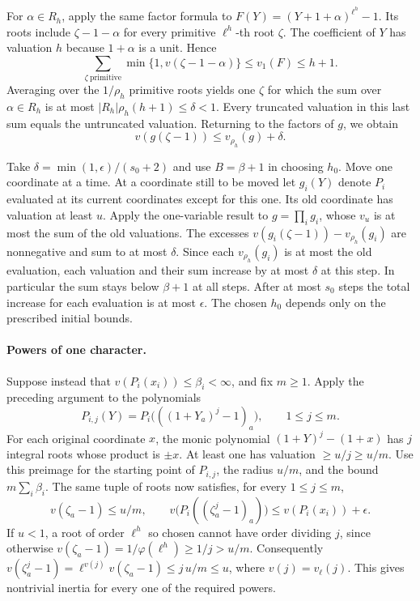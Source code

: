For \(\alpha\in R_h\), apply the same factor formula to
\(F(Y)=(Y+1+\alpha)^{\ell^h}-1\). Its roots include
\(\zeta-1-\alpha\) for every primitive \(\ell^h\)-th root \(\zeta\).
The coefficient of \(Y\) has valuation \(h\) because \(1+\alpha\) is
a unit. Hence
\[
 \sum_{\zeta\ \mathrm{primitive}}\min\{1,v(\zeta-1-\alpha)\}
 \le v_1(F)\le h+1.
\]
Averaging over the \(1/\rho_h\) primitive roots yields one \(\zeta\)
for which the sum over \(\alpha\in R_h\) is at most
\(|R_h|\rho_h(h+1)\le\delta<1\). Every truncated valuation in this
last sum equals the untruncated valuation. Returning to the factors
of \(g\), we obtain
\[
 v(g(\zeta-1))\le v_{\rho_h}(g)+\delta.
\]

Take \(\delta=\min(1,\epsilon)/(s_0+2)\) and use \(B=\beta+1\)
in choosing \(h_0\). Move one coordinate at a time. At a coordinate
still to be moved let \(g_i(Y)\) denote \(P_i\) evaluated at its
current coordinates except for this one. Its old coordinate has
valuation at least \(u\). Apply the one-variable result to
\(g=\prod_i g_i\), whose \(v_u\) is at most the sum of the old
valuations. The excesses
\(v(g_i(\zeta-1))-v_{\rho_h}(g_i)\) are nonnegative and sum to at
most \(\delta\). Since each \(v_{\rho_h}(g_i)\) is at most the
old evaluation, each valuation and their sum increase by at most
\(\delta\) at this step. In particular the sum stays below
\(\beta+1\) at all steps. After at most \(s_0\) steps the total
increase for each evaluation is at most \(\epsilon\). The chosen
\(h_0\) depends only on the prescribed initial bounds.

\paragraph{Powers of one character.}
Suppose instead that \(v(P_i(x_i))\le\beta_i<\infty\), and fix
\(m\ge1\). Apply the preceding argument to the polynomials
\[
 P_{i,j}(Y)=P_i\bigl(((1+Y_a)^j-1)_a\bigr),\qquad 1\le j\le m .
\]
For each original coordinate \(x\), the monic polynomial
\((1+Y)^j-(1+x)\) has \(j\) integral roots whose product is
\(\pm x\). At least one has valuation \(\ge u/j\ge u/m\).
Use this preimage for the starting point of \(P_{i,j}\), the radius
\(u/m\), and the bound \(m\sum_i\beta_i\).
The same tuple of roots now satisfies, for every \(1\le j\le m\),
\[
 v(\zeta_a-1)\le u/m,\qquad
 v\bigl(P_i((\zeta_a^j-1)_a)\bigr)\le v(P_i(x_i))+\epsilon .
\]
If \(u<1\), a root of order \(\ell^h\) so chosen cannot have order
dividing \(j\), since otherwise
\(v(\zeta_a-1)=1/\varphi(\ell^h)\ge1/j>u/m\).
Consequently
\(v(\zeta_a^j-1)=\ell^{v(j)}v(\zeta_a-1)\le j\,u/m\le u\),
where \(v(j)=v_\ell(j)\). This gives nontrivial inertia for every
one of the required powers.


